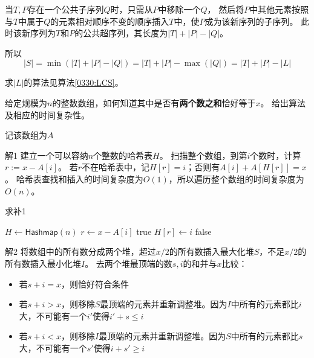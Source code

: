 \documentclass[answers]{exam}
\begin{document}
\begin{questions}
\begin{parts}
\begin{solution}
            当$T,P$存在一个公共子序列$Q$时，只需从$P$中移除一个$Q$，
            然后将$P$中其他元素按照与$T$中属于$Q$的元素相对顺序不变的顺序插入$T$中，使$P$成为该新序列的子序列。
            此时该新序列为$T$和$P$的公共超序列，其长度为$|T| + |P| - |Q| $。

            所以\[
                |S| = \min (|T| + |P| - |Q|) = |T| + |P| - \max (|Q|) = |T| + |P| - |L|
            \]

            求$|L|$的算法见算法\ref{0330:LCS}。
        \end{solution}
    \end{parts}

    \question 给定规模为$n$的整数数组，如何知道其中是否有\textbf{两个数之和}恰好等于$x$。
    给出算法及相应的时间复杂性。
    \begin{solution}
        记该数组为$A$

        \textsf{解1}\quad
        建立一个可以容纳$n$个整数的哈希表$H$。
        扫描整个数组，到第$i$个数时，计算$r := x - A[i]$。
        若$r$不在哈希表中，记$H[r] = i$；否则有$A[i] + A\left[H[r]\right] = x$。
        哈希表查找和插入的时间复杂度为$O(1)$，所以遍历整个数组的时间复杂度为$O(n)$。

        \begin{algorithm}[H]
            \caption{求补1}\label{0330:Composite1}
            \begin{algorithmic}[1]
                \State $H \gets \mathsf{Hashmap}(n)$
                \State $r \gets x - A[i]$
                \State \Return \textsf{true} 
                \Else
                \State $H[r] \gets i$
                \EndIf
                \EndFor
                \State \Return \textsf{false}
            \end{algorithmic}
        \end{algorithm}

        \textsf{解2}
        将数组中的所有数分成两个堆，超过$x/2$的所有数插入最大化堆$S$，不足$x/2$的所有数插入最小化堆$I$。
        去两个堆最顶端的数$s,i$的和并与$x$比较：
        \begin{itemize}
            \item 若$s + i = x$，则恰好符合条件
            \item 若$s + i > x$，则移除$S$最顶端的元素并重新调整堆。因为$I$中所有的元素都比$i$大，不可能有一个$i'$使得$i' + s \le i$
            \item 若$s + i < x$，则移除$I$最顶端的元素并重新调整堆。因为$S$中所有的元素都比$s$大，不可能有一个$s'$使得$i + s' \ge i$
        \end{itemize}


\end{solution}
\end{questions}
\end{document}
